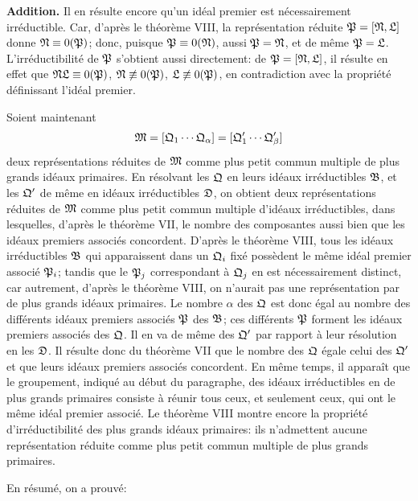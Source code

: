 \textbf{Addition.} Il en résulte encore qu'un idéal premier est nécessairement irréductible. Car, d'après le théorème VIII, la représentation réduite $\mathfrak{P}=[\mathfrak{N},\mathfrak{L}]$ donne $\mathfrak{N}\equiv0(\mathfrak{P})$; donc, puisque $\mathfrak{P}\equiv0(\mathfrak{N})$, aussi $\mathfrak{P}=\mathfrak{N}$, et de même $\mathfrak{P}=\mathfrak{L}$. L'irréductibilité de $\mathfrak{P}$ s'obtient aussi directement: de $\mathfrak{P}=[\mathfrak{N},\mathfrak{L}]$, il résulte en effet que $\mathfrak{N}\mathfrak{L}\equiv0(\mathfrak{P})$, $\mathfrak{N}\not\equiv0(\mathfrak{P})$, $\mathfrak{L}\not\equiv0(\mathfrak{P})$, en contradiction avec la propriété définissant l'idéal premier.

Soient maintenant
\[
 \mathfrak{M}=[\mathfrak{Q}_1\cdots\mathfrak{Q}_\alpha]=[\mathfrak{Q}'_1\cdots\mathfrak{Q}'_\beta]
\]
deux représentations réduites de $\mathfrak{M}$ comme plus petit commun multiple de plus grands idéaux primaires. En résolvant les $\mathfrak{Q}$ en leurs idéaux irréductibles $\mathfrak{B}$, et les $\mathfrak{Q}'$ de même en idéaux irréductibles $\mathfrak{D}$, on obtient deux représentations réduites de $\mathfrak{M}$ comme plus petit commun multiple d'idéaux irréductibles, dans lesquelles, d'après le théorème VII, le nombre des composantes aussi bien que les idéaux premiers associés concordent. D'après le théorème VIII, tous les idéaux irréductibles $\mathfrak{B}$ qui apparaissent dans un $\mathfrak{Q}_i$ fixé possèdent le même idéal premier associé $\mathfrak{P}_i$; tandis que le $\mathfrak{P}_j$ correspondant à $\mathfrak{Q}_j$ en est nécessairement distinct, car autrement, d'après le théorème VIII, on n'aurait pas une représentation par de plus grands idéaux primaires. Le nombre $\alpha$ des $\mathfrak{Q}$ est donc égal au nombre des différents idéaux premiers associés $\mathfrak{P}$ des $\mathfrak{B}$; ces différents $\mathfrak{P}$ forment les idéaux premiers associés des $\mathfrak{Q}$. Il en va de même des $\mathfrak{Q}'$ par rapport à leur résolution en les $\mathfrak{D}$. Il résulte donc du théorème VII que le nombre des $\mathfrak{Q}$ égale celui des $\mathfrak{Q}'$ et que leurs idéaux premiers associés concordent. En même temps, il apparaît que le groupement, indiqué au début du paragraphe, des idéaux irréductibles en de plus grands primaires consiste à réunir tous ceux, et seulement ceux, qui ont le même idéal premier associé. Le théorème VIII montre encore la propriété d'irréductibilité des plus grands idéaux primaires: ils n'admettent aucune représentation réduite comme plus petit commun multiple de plus grands primaires.

En résumé, on a prouvé:

